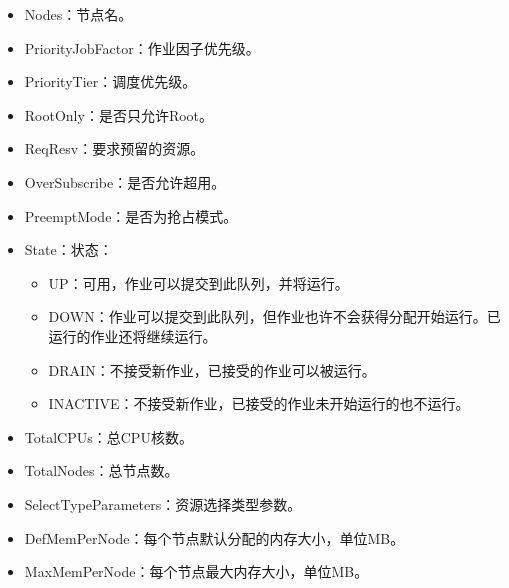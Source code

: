 \documentclass[a4paper,12pt,english]{sphinxmanual}
\begin{document}
\begin{itemize}
\item {} 
\sphinxAtStartPar
Nodes：节点名。

\item {} 
\sphinxAtStartPar
PriorityJobFactor：作业因子优先级。

\item {} 
\sphinxAtStartPar
PriorityTier：调度优先级。

\item {} 
\sphinxAtStartPar
RootOnly：是否只允许Root。

\item {} 
\sphinxAtStartPar
ReqResv：要求预留的资源。

\item {} 
\sphinxAtStartPar
OverSubscribe：是否允许超用。

\item {} 
\sphinxAtStartPar
PreemptMode：是否为抢占模式。

\item {} 
\sphinxAtStartPar
State：状态：
\begin{itemize}
\item {} 
\sphinxAtStartPar
UP：可用，作业可以提交到此队列，并将运行。

\item {} 
\sphinxAtStartPar
DOWN：作业可以提交到此队列，但作业也许不会获得分配开始运行。已运行的作业还将继续运行。

\item {} 
\sphinxAtStartPar
DRAIN：不接受新作业，已接受的作业可以被运行。

\item {} 
\sphinxAtStartPar
INACTIVE：不接受新作业，已接受的作业未开始运行的也不运行。

\end{itemize}

\item {} 
\sphinxAtStartPar
TotalCPUs：总CPU核数。

\item {} 
\sphinxAtStartPar
TotalNodes：总节点数。

\item {} 
\sphinxAtStartPar
SelectTypeParameters：资源选择类型参数。

\item {} 
\sphinxAtStartPar
DefMemPerNode：每个节点默认分配的内存大小，单位MB。

\item {} 
\sphinxAtStartPar
MaxMemPerNode：每个节点最大内存大小，单位MB。

\end{itemize}
\end{document}
